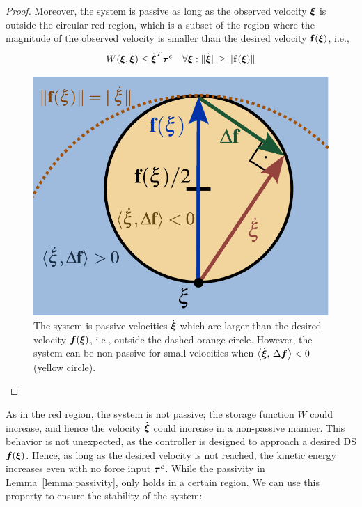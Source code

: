 \begin{proof}
Moreover, the system is passive as long as the observed velocity $\dot{{\boldsymbol{\xi}}}$ is outside the circular-red region, which is a subset of the region where the magnitude of the observed velocity is smaller than the desired velocity $\mathbf{f}({\boldsymbol{\xi}})$, i.e.,
\begin{equation}
	\dot W({\boldsymbol{\xi}}, \dot{{\boldsymbol{\xi}}}) \leq \dot{{\boldsymbol{\xi}}}^T \boldsymbol{\tau}^e
 \quad \forall {\boldsymbol{\xi}} : \| \dot{{\boldsymbol{\xi}}} \| \geq\| \mathbf{f}({\boldsymbol{\xi}}) \| 
\end{equation}

\begin{figure}[b]
	\centering
    \includegraphics[width=0.7\columnwidth]{figures/passivity_analysis}
	\caption{The system is passive velocities $\dot{\boldsymbol{\xi}}$ which are larger than the desired velocity $\boldsymbol{f}(\boldsymbol{\xi})$, i.e., outside the dashed orange circle.
    However, the system can be non-passive for small velocities when  $\left\langle {\dot{\boldsymbol{\xi}}}, \, {\Delta \boldsymbol{f}} \right\rangle < 0$ (yellow circle). }
	\label{fig:passivity_analysis}
\end{figure}

\end{proof}

As in the red region, the system is not passive; the storage function $W$ could increase, and hence the velocity $\dot {\boldsymbol{\xi}}$ could increase in a non-passive manner. This behavior is not unexpected, as the controller is designed to approach a desired DS $\boldsymbol{f}({\boldsymbol{\xi}})$. Hence, as long as the desired velocity is not reached, the kinetic energy increases even with no force input $\boldsymbol{\tau}^e$. While the passivity in Lemma~\ref{lemma:passivity}, only holds in a certain region. We can use this property to ensure the stability of the system:

